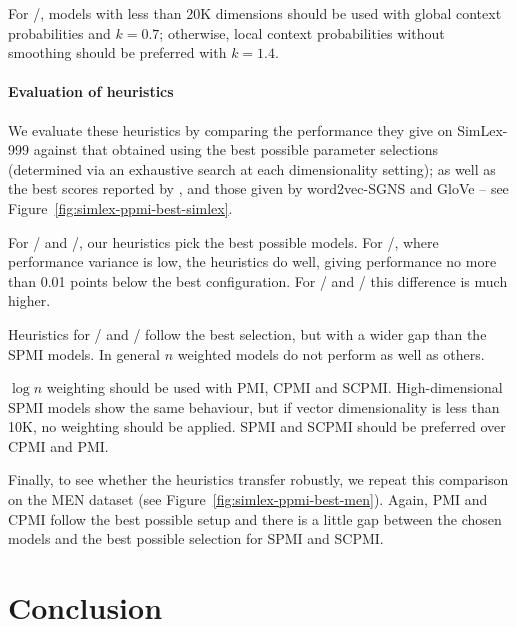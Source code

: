 \documentclass[11pt]{article}
\begin{document}
For \logNSCPMI/, models with less than 20K dimensions should be used with global context probabilities and $k = 0.7$; otherwise, local context probabilities without smoothing should be preferred with $k = 1.4$.

\paragraph{Evaluation of heuristics}
\label{sec:heuristic-evaluation}

We evaluate these heuristics by comparing the performance they give on SimLex-999 against that obtained using the best possible parameter selections (determined via an exhaustive search at each dimensionality setting); as well as the best scores reported by \cite{TACL570}, and those given by word2vec-SGNS \cite{mikolov2013efficient} and GloVe \cite{pennington2014glove} -- see Figure~\ref{fig:simlex-ppmi-best-simlex}.

For \logNPMI/ and \logNCPMI/, our heuristics pick the best possible models. For \logNSPMI/, where performance variance is low, the heuristics do well, giving performance no more than 0.01 points below the best configuration. For \SPMI/ and \NSPMI/ this difference is much higher. 

Heuristics for \logNSCPMI/ and \SCPMI/ follow the best selection, but with a wider gap than the SPMI models. In general $n$ weighted models do not perform as well as others. 

$\log n$ weighting should be used with PMI, CPMI and SCPMI. High-dimensional SPMI models show the same behaviour, but if vector dimensionality is less than 10K, no weighting should be applied. SPMI and SCPMI should be preferred over CPMI and PMI.

Finally, to see whether the heuristics transfer robustly, we repeat this comparison on the MEN dataset (see Figure~\ref{fig:simlex-ppmi-best-men}). Again, PMI and CPMI follow the best possible setup and there is a little gap between the chosen models and the best possible selection for SPMI and SCPMI.


\section{Conclusion}
\label{sec:conclusion}
\end{document}
